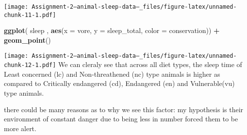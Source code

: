 \documentclass[
]{article}
\newenvironment{Shaded}{\begin{snugshade}}{\end{snugshade}}
\newcommand{\AttributeTok}[1]{\textcolor[rgb]{0.13,0.29,0.53}{#1}}
\newcommand{\FunctionTok}[1]{\textcolor[rgb]{0.13,0.29,0.53}{\textbf{#1}}}
\newcommand{\NormalTok}[1]{#1}
\newcommand{\SpecialCharTok}[1]{\textcolor[rgb]{0.81,0.36,0.00}{\textbf{#1}}}
\begin{document}
\texttt{[image: Assignment-2---animal-sleep-data--\_files/figure-latex/unnamed-chunk-11-1.pdf]}

\begin{Shaded}
\begin{Highlighting}[]
\FunctionTok{ggplot}\NormalTok{( sleep , }\FunctionTok{aes}\NormalTok{(}\AttributeTok{x =}\NormalTok{ vore, }\AttributeTok{y =}\NormalTok{ sleep\_total, }\AttributeTok{color =}\NormalTok{ conservation)) }\SpecialCharTok{+} \FunctionTok{geom\_point}\NormalTok{()}
\end{Highlighting}
\end{Shaded}

\texttt{[image: Assignment-2---animal-sleep-data--\_files/figure-latex/unnamed-chunk-12-1.pdf]}
We can cleraly see that across all diet types, the sleep time of Least
concerned (lc) and Non-threathened (nc) type animals is higher as
compared to Critically endangered (cd), Endangered (en) and
Vulnerable(vu) type animals.

there could be many reasons as to why we see this factor: my hypothesis
is their environment of constant danger due to being less in number
forced them to be more alert.
\end{document}
